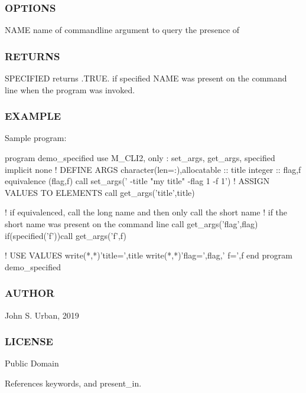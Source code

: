 \subsubsection*{O\+P\+T\+I\+O\+NS}

\begin{DoxyVerb}NAME   name of commandline argument to query the presence of
\end{DoxyVerb}


\subsubsection*{R\+E\+T\+U\+R\+NS}

S\+P\+E\+C\+I\+F\+I\+ED returns .T\+R\+UE. if specified N\+A\+ME was present on the command line when the program was invoked.

\subsubsection*{E\+X\+A\+M\+P\+LE}

Sample program\+: \begin{DoxyVerb}program demo_specified
use M_CLI2,  only : set_args, get_args, specified
implicit none
! DEFINE ARGS
character(len=:),allocatable   :: title
integer                        :: flag,f
equivalence (flag,f)
   call set_args(' -title "my title" -flag 1 -f 1')
! ASSIGN VALUES TO ELEMENTS
   call get_args('title',title)

   ! if equivalenced, call the long name and then only call the short name
   ! if the short name was present on the command line
   call get_args('flag',flag)
   if(specified('f'))call get_args('f',f)

! USE VALUES
   write(*,*)'title=',title
   write(*,*)'flag=',flag,' f=',f
end program demo_specified
\end{DoxyVerb}


\subsubsection*{A\+U\+T\+H\+OR}

John S. Urban, 2019 \subsubsection*{L\+I\+C\+E\+N\+SE}

Public Domain 

References keywords, and present\+\_\+in.

\mbox{\label{namespacem__cli2_a6578e29ee4dc56651528e7e0acd29665}} 

